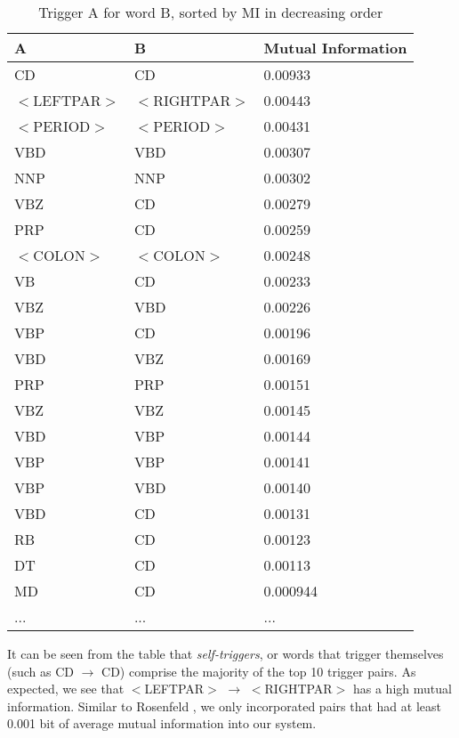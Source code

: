 \documentclass[11pt]{article}
\begin{document}
\begin{table*}[h!]
\begin{small}
\begin{center}
\caption{Trigger {\sf A} for word {\sf B}, sorted by MI in decreasing order}
\label{t:triggerpairs}
\begin{tabular}{|l|l|l|}
\hline
{\sf A} & {\sf B} & {\sf Mutual Information} \\
\hline
CD & CD & 0.00933 \\
$<$LEFTPAR$>$ & $<$RIGHTPAR$>$ & 0.00443 \\
$<$PERIOD$>$ & $<$PERIOD$>$ & 0.00431 \\
VBD & VBD & 0.00307 \\
NNP & NNP & 0.00302 \\
VBZ & CD & 0.00279 \\
PRP & CD & 0.00259 \\
$<$COLON$>$ & $<$COLON$>$ & 0.00248 \\
VB & CD & 0.00233 \\
VBZ & VBD & 0.00226 \\
VBP & CD & 0.00196 \\
VBD & VBZ & 0.00169 \\
PRP & PRP & 0.00151 \\
VBZ & VBZ & 0.00145 \\
VBD & VBP & 0.00144 \\
VBP & VBP & 0.00141 \\
VBP & VBD & 0.00140 \\
VBD & CD & 0.00131 \\
RB & CD & 0.00123 \\
DT & CD & 0.00113 \\
MD & CD & 0.000944 \\
... & ... & ... \\
\hline
\end{tabular}\vspace*{-5mm}
\end{center}
\end{small}
\end{table*}

\noindent
It can be seen from the table that {\em self-triggers}, or words that trigger themselves (such as CD $\rightarrow$ CD) comprise the majority of the top 10 trigger pairs.
As expected, we see that $<$LEFTPAR$>$ $\rightarrow$ $<$RIGHTPAR$>$ has a high mutual information.
Similar to Rosenfeld \cite{rosenfeld1996}, we only incorporated pairs that had at least 0.001 bit of average mutual information into our system.
\end{document}
